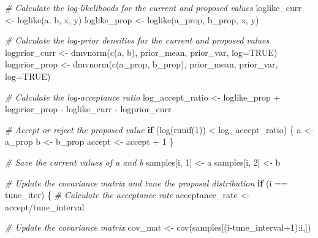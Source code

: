 \documentclass[
]{article}
\newenvironment{Shaded}{\begin{snugshade}}{\end{snugshade}}
\newcommand{\AttributeTok}[1]{\textcolor[rgb]{0.77,0.63,0.00}{#1}}
\newcommand{\CommentTok}[1]{\textcolor[rgb]{0.56,0.35,0.01}{\textit{#1}}}
\newcommand{\ConstantTok}[1]{\textcolor[rgb]{0.00,0.00,0.00}{#1}}
\newcommand{\ControlFlowTok}[1]{\textcolor[rgb]{0.13,0.29,0.53}{\textbf{#1}}}
\newcommand{\DecValTok}[1]{\textcolor[rgb]{0.00,0.00,0.81}{#1}}
\newcommand{\FunctionTok}[1]{\textcolor[rgb]{0.00,0.00,0.00}{#1}}
\newcommand{\NormalTok}[1]{#1}
\newcommand{\OtherTok}[1]{\textcolor[rgb]{0.56,0.35,0.01}{#1}}
\newcommand{\SpecialCharTok}[1]{\textcolor[rgb]{0.00,0.00,0.00}{#1}}
\begin{document}
\begin{Shaded}
\begin{Highlighting}[]
  \CommentTok{\# Calculate the log{-}likelihoods for the current and proposed values}
\NormalTok{  loglike\_curr }\OtherTok{\textless{}{-}} \FunctionTok{loglike}\NormalTok{(a, b, x, y)}
\NormalTok{  loglike\_prop }\OtherTok{\textless{}{-}} \FunctionTok{loglike}\NormalTok{(a\_prop, b\_prop, x, y)}
  
  \CommentTok{\# Calculate the log{-}prior densities for the current and proposed values}
\NormalTok{  logprior\_curr }\OtherTok{\textless{}{-}} \FunctionTok{dmvnorm}\NormalTok{(}\FunctionTok{c}\NormalTok{(a, b), prior\_mean, prior\_var, }\AttributeTok{log=}\ConstantTok{TRUE}\NormalTok{)}
\NormalTok{  logprior\_prop }\OtherTok{\textless{}{-}} \FunctionTok{dmvnorm}\NormalTok{(}\FunctionTok{c}\NormalTok{(a\_prop, b\_prop), prior\_mean, prior\_var, }\AttributeTok{log=}\ConstantTok{TRUE}\NormalTok{)}
  
  \CommentTok{\# Calculate the log{-}acceptance ratio}
\NormalTok{  log\_accept\_ratio }\OtherTok{\textless{}{-}}\NormalTok{ loglike\_prop }\SpecialCharTok{+}\NormalTok{ logprior\_prop }\SpecialCharTok{{-}}\NormalTok{ loglike\_curr }\SpecialCharTok{{-}}\NormalTok{ logprior\_curr}
  
  \CommentTok{\# Accept or reject the proposed value}
  \ControlFlowTok{if}\NormalTok{ (}\FunctionTok{log}\NormalTok{(}\FunctionTok{runif}\NormalTok{(}\DecValTok{1}\NormalTok{)) }\SpecialCharTok{\textless{}}\NormalTok{ log\_accept\_ratio) \{}
\NormalTok{    a }\OtherTok{\textless{}{-}}\NormalTok{ a\_prop}
\NormalTok{    b }\OtherTok{\textless{}{-}}\NormalTok{ b\_prop}
\NormalTok{    accept }\OtherTok{\textless{}{-}}\NormalTok{ accept }\SpecialCharTok{+} \DecValTok{1}
\NormalTok{  \}}
  
  \CommentTok{\# Save the current values of a and b}
\NormalTok{  samples[i, }\DecValTok{1}\NormalTok{] }\OtherTok{\textless{}{-}}\NormalTok{ a}
\NormalTok{  samples[i, }\DecValTok{2}\NormalTok{] }\OtherTok{\textless{}{-}}\NormalTok{ b}
  
  \CommentTok{\# Update the covariance matrix and tune the proposal distribution}
  \ControlFlowTok{if}\NormalTok{ (i }\SpecialCharTok{==}\NormalTok{ tune\_iter) \{}
    \CommentTok{\# Calculate the acceptance rate}
\NormalTok{    acceptance\_rate }\OtherTok{\textless{}{-}}\NormalTok{ accept}\SpecialCharTok{/}\NormalTok{tune\_interval}
    
    \CommentTok{\# Update the covariance matrix}
\NormalTok{    cov\_mat }\OtherTok{\textless{}{-}} \FunctionTok{cov}\NormalTok{(samples[(i}\SpecialCharTok{{-}}\NormalTok{tune\_interval}\SpecialCharTok{+}\DecValTok{1}\NormalTok{)}\SpecialCharTok{:}\NormalTok{i,])}
    

\end{Highlighting}
\end{Shaded}
\end{document}
